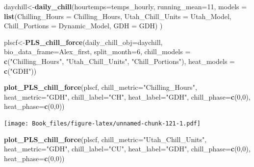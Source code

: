 \documentclass[
]{book}
\newenvironment{Shaded}{\begin{snugshade}}{\end{snugshade}}
\newcommand{\DataTypeTok}[1]{\textcolor[rgb]{0.13,0.29,0.53}{#1}}
\newcommand{\DecValTok}[1]{\textcolor[rgb]{0.00,0.00,0.81}{#1}}
\newcommand{\KeywordTok}[1]{\textcolor[rgb]{0.13,0.29,0.53}{\textbf{#1}}}
\newcommand{\NormalTok}[1]{#1}
\newcommand{\StringTok}[1]{\textcolor[rgb]{0.31,0.60,0.02}{#1}}
\begin{document}
\begin{Shaded}
\begin{Highlighting}[]
\NormalTok{daychill<-}\KeywordTok{daily_chill}\NormalTok{(}\DataTypeTok{hourtemps=}\NormalTok{temps_hourly,}
            \DataTypeTok{running_mean=}\DecValTok{11}\NormalTok{,}
            \DataTypeTok{models =} \KeywordTok{list}\NormalTok{(}\DataTypeTok{Chilling_Hours =}\NormalTok{ Chilling_Hours, }\DataTypeTok{Utah_Chill_Units =}\NormalTok{ Utah_Model,}
    \DataTypeTok{Chill_Portions =}\NormalTok{ Dynamic_Model, }\DataTypeTok{GDH =}\NormalTok{ GDH)}
\NormalTok{    )}

\NormalTok{plscf<-}\KeywordTok{PLS_chill_force}\NormalTok{(}\DataTypeTok{daily_chill_obj=}\NormalTok{daychill,}
                       \DataTypeTok{bio_data_frame=}\NormalTok{Alex_first,}
                       \DataTypeTok{split_month=}\DecValTok{6}\NormalTok{,}
                       \DataTypeTok{chill_models =} \KeywordTok{c}\NormalTok{(}\StringTok{"Chilling_Hours"}\NormalTok{, }\StringTok{"Utah_Chill_Units"}\NormalTok{, }\StringTok{"Chill_Portions"}\NormalTok{),}
                       \DataTypeTok{heat_models =} \KeywordTok{c}\NormalTok{(}\StringTok{"GDH"}\NormalTok{))}

\KeywordTok{plot_PLS_chill_force}\NormalTok{(plscf,}
                     \DataTypeTok{chill_metric=}\StringTok{"Chilling_Hours"}\NormalTok{,}
                     \DataTypeTok{heat_metric=}\StringTok{"GDH"}\NormalTok{,}
                     \DataTypeTok{chill_label=}\StringTok{"CH"}\NormalTok{,}
                     \DataTypeTok{heat_label=}\StringTok{"GDH"}\NormalTok{,}
                     \DataTypeTok{chill_phase=}\KeywordTok{c}\NormalTok{(}\DecValTok{0}\NormalTok{,}\DecValTok{0}\NormalTok{),}
                     \DataTypeTok{heat_phase=}\KeywordTok{c}\NormalTok{(}\DecValTok{0}\NormalTok{,}\DecValTok{0}\NormalTok{))}
\end{Highlighting}
\end{Shaded}

\texttt{[image: Book\_files/figure-latex/unnamed-chunk-121-1.pdf]}

\begin{Shaded}
\begin{Highlighting}[]
\KeywordTok{plot_PLS_chill_force}\NormalTok{(plscf,}
                     \DataTypeTok{chill_metric=}\StringTok{"Utah_Chill_Units"}\NormalTok{,}
                     \DataTypeTok{heat_metric=}\StringTok{"GDH"}\NormalTok{,}
                     \DataTypeTok{chill_label=}\StringTok{"CU"}\NormalTok{,}
                     \DataTypeTok{heat_label=}\StringTok{"GDH"}\NormalTok{,}
                     \DataTypeTok{chill_phase=}\KeywordTok{c}\NormalTok{(}\DecValTok{0}\NormalTok{,}\DecValTok{0}\NormalTok{),}
                     \DataTypeTok{heat_phase=}\KeywordTok{c}\NormalTok{(}\DecValTok{0}\NormalTok{,}\DecValTok{0}\NormalTok{))}
\end{Highlighting}
\end{Shaded}
\end{document}
